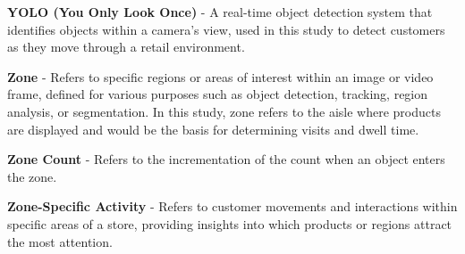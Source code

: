 {\textbf{YOLO (You Only Look Once)} - A real-time object detection system that identifies objects within a camera's view, used in this study to detect customers as they move through a retail environment.

\textbf{Zone} - Refers to specific regions or areas of interest within an image or video frame, defined for various purposes such as object detection, tracking, region analysis, or segmentation. In this study, zone refers to the aisle where products are displayed and would be the basis for determining visits and dwell time.

\textbf{Zone Count} - Refers to the incrementation of the count when an object enters the zone.

\textbf{Zone-Specific Activity} - Refers to customer movements and interactions within specific areas of a store, providing insights into which products or regions attract the most attention.

}
